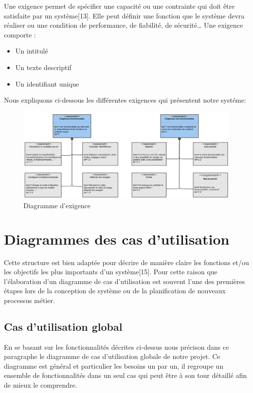 Une exigence permet de spécifier une capacité ou une contrainte qui doit être satisfaite par un système[13]. 
Elle peut définir une fonction que le système devra réaliser ou une condition de performance, de fiabilité, de sécurité… 
Une exigence comporte : 
\begin{itemize}
	\item Un intitulé 
	
	
	\item Un texte descriptif 
	
	
	\item Un identifiant unique
\end{itemize}
Nous expliquons ci-dessous les différentes exigences qui présentent notre systéme:
\begin{figure}[h] 
	\begin{center} 
		\centering
		\includegraphics[width=1.2\linewidth]{Images/Diagramme d'exigence}
		\caption{Diagramme d'exigence}
	\end{center}
\end{figure}	
\section{Diagrammes des cas d'utilisation }
Cette structure est bien adaptée pour décrire de manière claire les fonctions et/ou les objectifs les plus importants d’un système[15]. Pour cette raison que l’élaboration d’un diagramme de cas d’utilisation est souvent l’une des premières étapes lors de la conception de système ou de la planification de nouveaux processus métier. 

		\subsection{Cas d'utilisation global }
		
		En se basant sur les fonctionnalités décrites ci-dessus nous précison dans ce paragraphe le diagramme de cas d'utilisation globale de notre projet. Ce diagramme est général et particulier les besoins un par un, il regroupe un ensemble de fonctionnalités dans un seul cas qui peut être à son tour détaillé afin de mieux le comprendre.
		
